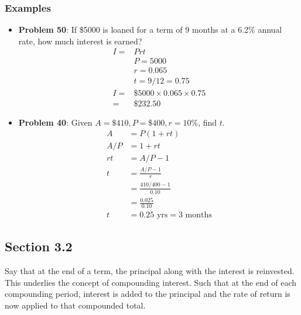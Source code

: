 \documentclass[14pt]{extarticle}
\begin{document}
\subsubsection*{Examples}
\begin{itemize}
	\item \textbf{Problem 50}: If \$5000 is loaned for a term of 9 months at a 6.2\% annual rate, how much interest is earned?
	\begin{align*}
		I= &Prt \\
		&P = 5000 \\
		&r = 0.065 \\
		&t = 9/12 = 0.75 \\
		I =& \$5000 \times 0.065 \times 0.75 \\
		= &  \$232.50
	\end{align*}
	\item \textbf{Problem 40}: Given $A = \$410, P = \$400, r=10\%$, find $t$.
	\begin{align*}
		A &= P(1+rt) \\
		A/P &= 1+ rt \\
		rt & = A/P - 1 \\
		t &= \frac{A/P - 1}{r} \\
		&= \frac{410/400 - 1}{0.10} \\
		&= \frac{0.025}{0.10} \\
		t &= 0.25 \text{ yrs} = 3 \text{ months}
	\end{align*}
\end{itemize}

\subsection{Section 3.2}
Say that at the end of a term, the principal along with the interest is reinvested. This underlies the concept of compounding interest. Such that at the end of each compounding period, interest is added to the principal and the rate of return is now applied to that compounded total.
\end{document}

